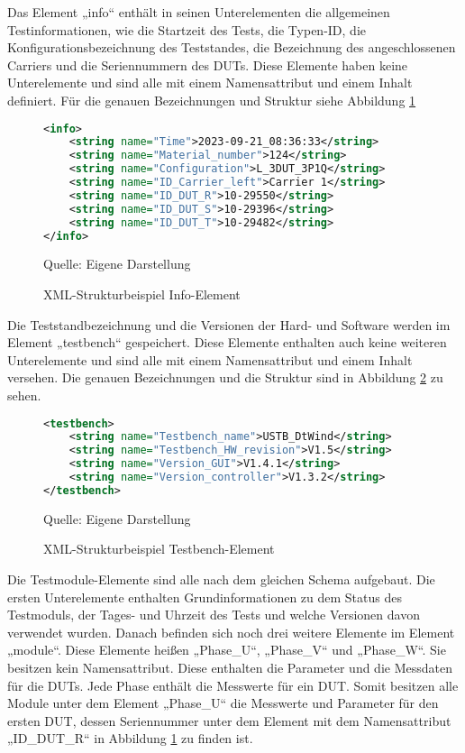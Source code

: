 Das Element „info“ enthält in seinen Unterelementen die allgemeinen Testinformationen, wie die Startzeit des Tests,
die Typen-ID, die Konfigurationsbezeichnung des Teststandes, die Bezeichnung des angeschlossenen Carriers und die
Seriennummern des \ac{DUTs}. Diese Elemente haben keine Unterelemente und sind alle mit einem Namensattribut und einem Inhalt definiert.
Für die genauen Bezeichnungen und Struktur siehe Abbildung \ref{fig: XML-Strukturbeispiel Info-Element}

\begin{figure}[H]
\centering
\begin{minipage}{0.95\textwidth}
\begin{lstlisting}[language=XML]
<info>
	<string name="Time">2023-09-21_08:36:33</string>
	<string name="Material_number">124</string>
	<string name="Configuration">L_3DUT_3P1Q</string>
	<string name="ID_Carrier_left">Carrier 1</string>
	<string name="ID_DUT_R">10-29550</string>
	<string name="ID_DUT_S">10-29396</string>
    <string name="ID_DUT_T">10-29482</string>
</info>
\end{lstlisting}
\end{minipage}
\caption{XML-Strukturbeispiel Info-Element}
\label{fig: XML-Strukturbeispiel Info-Element}
    {Quelle: Eigene Darstellung}
\end{figure}

Die Teststandbezeichnung und die Versionen der Hard- und Software werden im Element „testbench“ gespeichert.
Diese Elemente enthalten auch keine weiteren Unterelemente und sind alle mit einem Namensattribut und einem Inhalt versehen.
Die genauen Bezeichnungen und die Struktur sind in Abbildung \ref{fig: XML-Strukturbeispiel Testbench-Element} zu sehen.

\begin{figure}[H]
\centering
\begin{minipage}{0.95\textwidth}
\begin{lstlisting}[language=XML]
<testbench>
	<string name="Testbench_name">USTB_DtWind</string>
	<string name="Testbench_HW_revision">V1.5</string>
	<string name="Version_GUI">V1.4.1</string>
    <string name="Version_controller">V1.3.2</string>
</testbench>
\end{lstlisting}
\end{minipage}
\caption{XML-Strukturbeispiel Testbench-Element}
\label{fig: XML-Strukturbeispiel Testbench-Element}
    {Quelle: Eigene Darstellung}
\end{figure}


Die Testmodule-Elemente sind alle nach dem gleichen Schema aufgebaut. Die ersten Unterelemente enthalten Grundinformationen
zu dem Status des Testmoduls, der Tages- und Uhrzeit des Tests und welche Versionen davon verwendet wurden.
Danach befinden sich noch drei weitere Elemente im Element „module“.
Diese Elemente heißen „Phase_U“, „Phase_V“ und „Phase_W“.
Sie besitzen kein Namensattribut.
Diese enthalten die Parameter und die Messdaten für die DUTs. Jede Phase enthält die Messwerte für ein DUT.
Somit besitzen alle Module unter dem Element „Phase_U“ die Messwerte und Parameter für den ersten DUT, dessen Seriennummer
unter dem Element mit dem Namensattribut „ID_DUT_R“ in Abbildung \ref{fig: XML-Strukturbeispiel Info-Element} zu finden ist.

